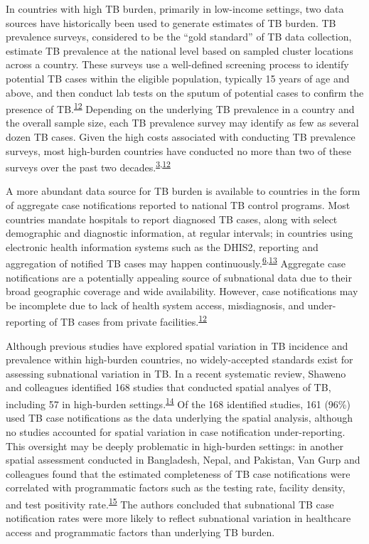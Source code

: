 \documentclass[
]{article}
\begin{document}
In countries with high TB burden, primarily in low-income settings, two data sources have historically been used to generate estimates of TB burden. TB prevalence surveys, considered to be the ``gold standard'' of TB data collection, estimate TB prevalence at the national level based on sampled cluster locations across a country. These surveys use a well-defined screening process to identify potential TB cases within the eligible population, typically 15 years of age and above, and then conduct lab tests on the sputum of potential cases to confirm the presence of TB.\textsuperscript{\protect\hyperlink{ref-Glaziou2008}{12}} Depending on the underlying TB prevalence in a country and the overall sample size, each TB prevalence survey may identify as few as several dozen TB cases. Given the high costs associated with conducting TB prevalence surveys, most high-burden countries have conducted no more than two of these surveys over the past two decades.\textsuperscript{\protect\hyperlink{ref-WorldHealthOrganization2019}{3},\protect\hyperlink{ref-Glaziou2008}{12}}

A more abundant data source for TB burden is available to countries in the form of aggregate case notifications reported to national TB control programs. Most countries mandate hospitals to report diagnosed TB cases, along with select demographic and diagnostic information, at regular intervals; in countries using electronic health information systems such as the DHIS2, reporting and aggregation of notified TB cases may happen continuously.\textsuperscript{\protect\hyperlink{ref-WorldHealthOrganization2020}{6},\protect\hyperlink{ref-Dehnavieh2019}{13}} Aggregate case notifications are a potentially appealing source of subnational data due to their broad geographic coverage and wide availability. However, case notifications may be incomplete due to lack of health system access, misdiagnosis, and under-reporting of TB cases from private facilities.\textsuperscript{\protect\hyperlink{ref-Glaziou2008}{12}}

Although previous studies have explored spatial variation in TB incidence and prevalence within high-burden countries, no widely-accepted standards exist for assessing subnational variation in TB. In a recent systematic review, Shaweno and colleagues identified 168 studies that conducted spatial analyes of TB, including 57 in high-burden settings.\textsuperscript{\protect\hyperlink{ref-Shaweno2018}{14}} Of the 168 identified studies, 161 (96\%) used TB case notifications as the data underlying the spatial analysis, although no studies accounted for spatial variation in case notification under-reporting. This oversight may be deeply problematic in high-burden settings: in another spatial assessment conducted in Bangladesh, Nepal, and Pakistan, Van Gurp and colleagues found that the estimated completeness of TB case notifications were correlated with programmatic factors such as the testing rate, facility density, and test positivity rate.\textsuperscript{\protect\hyperlink{ref-VanGurp2020}{15}} The authors concluded that subnational TB case notification rates were more likely to reflect subnational variation in healthcare access and programmatic factors than underlying TB burden.
\end{document}
